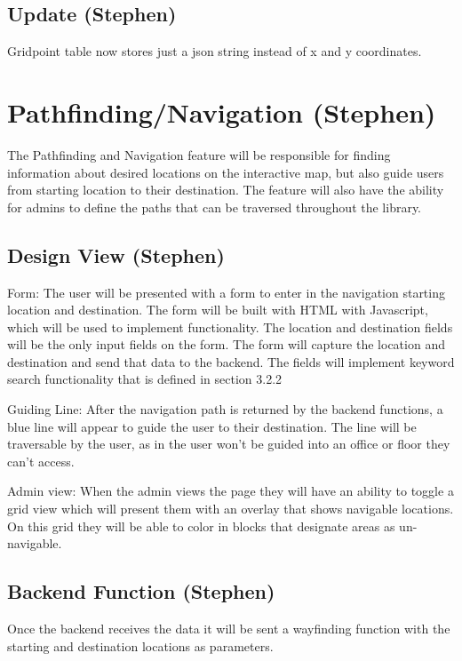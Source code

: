 \documentclass[letterpaper,10pt,titlepage, onecolumn, compsoc]{IEEEtran}
\begin{document}
\subsection{Update (Stephen)}
Gridpoint table now stores just a json string instead of x and y coordinates. 

\section{Pathfinding/Navigation (Stephen)}
The Pathfinding and Navigation feature will be responsible for finding information about desired locations on the interactive map, but also guide users from starting location to their destination. The feature will also have the ability for admins to define the paths that can be traversed throughout the library.

\subsection{Design View (Stephen)}
Form: The user will be presented with a form to enter in the navigation starting location and destination. The form will be built with HTML with Javascript, which will be used to implement functionality. The location and destination fields will be the only input fields on the form.  The form will capture the location and destination and send that data to the backend. The fields will implement keyword search functionality that is defined in section 3.2.2
 
Guiding Line: After the navigation path is returned by the backend functions, a blue line will appear to guide the user to their destination. The line will be traversable by the user, as in the user won’t be guided into an office or floor they can’t access.
 
Admin view: When the admin views the page they will have an ability to toggle a grid view which will present them with an overlay that shows navigable locations. On this grid they will be able to color in blocks that designate areas as un-navigable.

\subsection{Backend Function (Stephen)}
Once the backend receives the data it will be sent a wayfinding function with the starting and destination locations as parameters.
 
\end{document}
